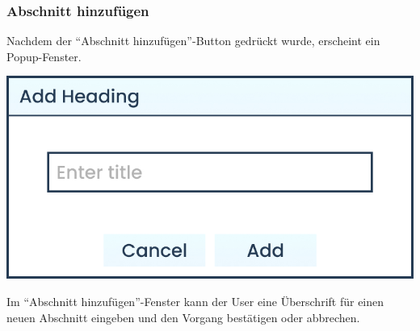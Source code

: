 \clearpage

\subsubsection{Abschnitt hinzufügen}
Nachdem der \enquote{Abschnitt hinzufügen}-Button gedrückt wurde, erscheint ein Popup-Fenster.

\begin{center}
\begin{minipage}
{0.5\linewidth}

\includegraphics[width=\textwidth]{assets/img/Add_Heading_Box}

\end{minipage}
\end{center}
Im \enquote{Abschnitt hinzufügen}-Fenster kann der User eine Überschrift für einen neuen Abschnitt eingeben und den
Vorgang bestätigen oder abbrechen.

